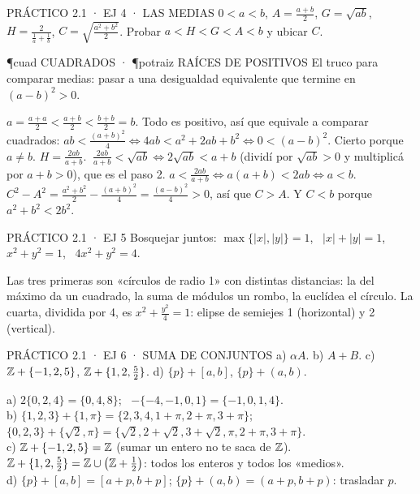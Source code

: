 \begin{enunciado}{PRÁCTICO 2.1 · EJ 4 · LAS MEDIAS}
$0<a<b$, $A=\frac{a+b}2$, $G=\sqrt{ab}$, $H=\frac2{\frac1a+\frac1b}$, $C=\sqrt{\frac{a^2+b^2}2}$. Probar $a<H<G<A<b$ y ubicar $C$.
\end{enunciado}
\begin{uso}{\P{cuad} CUADRADOS · \P{potraiz} RAÍCES DE POSITIVOS}
El truco para comparar medias: pasar a una desigualdad equivalente que termine en $(a-b)^2>0$.
\end{uso}
$a=\frac{a+a}2<\frac{a+b}2<\frac{b+b}2=b$.
Todo es positivo, así que equivale a comparar cuadrados: $ab<\frac{(a+b)^2}4\iff4ab<a^2+2ab+b^2\iff0<(a-b)^2$. Cierto porque $a\neq b$.
$H=\frac{2ab}{a+b}$. $\ \frac{2ab}{a+b}<\sqrt{ab}\iff2\sqrt{ab}<a+b$ (dividí por $\sqrt{ab}>0$ y multiplicá por $a+b>0$), que es el paso 2.
$a<\frac{2ab}{a+b}\iff a(a+b)<2ab\iff a<b$.
$C^2-A^2=\frac{a^2+b^2}2-\frac{(a+b)^2}4=\frac{(a-b)^2}4>0$, así que $C>A$. Y $C<b$ porque $a^2+b^2<2b^2$.

\begin{enunciado}{PRÁCTICO 2.1 · EJ 5}
Bosquejar juntos: $\max\{|x|,|y|\}=1$, \ $|x|+|y|=1$, \ $x^2+y^2=1$, \ $4x^2+y^2=4$.
\end{enunciado}
\begin{center}
\end{center}
Las tres primeras son «círculos de radio 1» con distintas distancias: la del máximo da un cuadrado, la suma de módulos un rombo, la euclídea el círculo. La cuarta, dividida por 4, es $x^2+\frac{y^2}{4}=1$: elipse de semiejes 1 (horizontal) y 2 (vertical).

\begin{enunciado}{PRÁCTICO 2.1 · EJ 6 · SUMA DE CONJUNTOS}
a) $\alpha A$. b) $A+B$. c) $\mathbb{Z}+\{-1,2,5\}$, $\mathbb{Z}+\{1,2,\frac52\}$. d) $\{p\}+[a,b]$, $\{p\}+(a,b)$.
\end{enunciado}
a) $2\{0,2,4\}=\{0,4,8\}$; \ $-\{-4,-1,0,1\}=\{-1,0,1,4\}$.\\
b) $\{1,2,3\}+\{1,\pi\}=\{2,3,4,1+\pi,2+\pi,3+\pi\}$; \ $\{0,2,3\}+\{\sqrt2,\pi\}=\{\sqrt2,2+\sqrt2,3+\sqrt2,\pi,2+\pi,3+\pi\}$.\\
c) $\mathbb{Z}+\{-1,2,5\}=\mathbb{Z}$ (sumar un entero no te saca de $\mathbb{Z}$). \ $\mathbb{Z}+\{1,2,\frac52\}=\mathbb{Z}\cup\big(\mathbb{Z}+\frac12\big)$: todos los enteros y todos los «medios».\\
d) $\{p\}+[a,b]=[a+p,b+p]$; $\{p\}+(a,b)=(a+p,b+p)$: trasladar $p$.

